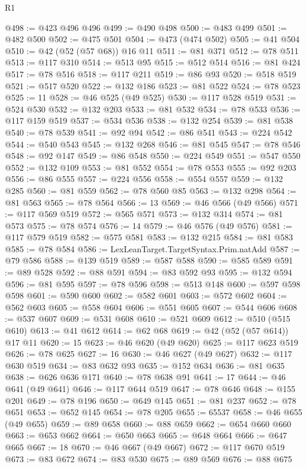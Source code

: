 \begin{lexlean}{R1}
\begin{coremodule}
@498 := @423 @496 @496
@499 := @490 @498
@500 := @483 @499
@501 := @482 @500
@502 := @475 @501
@504 := @473 (@474 @502)
@505 := @41 @504
@510 := @42 (@52 (@57 @68)) @16 @11
@511 := @81 @371
@512 := @78 @511
@513 := @117 @310
@514 := @513 @95
@515 := @512 @514
@516 := @81 @424
@517 := @78 @516
@518 := @117 @211
@519 := @86 @93
@520 := @518 @519
@521 := @517 @520
@522 := @132 @186
@523 := @81 @522
@524 := @78 @523
@525 := 11
@528 := @46 @525 (@49 @525)
@530 := @117 @528 @519
@531 := @524 @530
@532 := @132 @203
@533 := @81 @532
@534 := @78 @533
@536 := @117 @159 @519
@537 := @534 @536
@538 := @132 @254
@539 := @81 @538
@540 := @78 @539
@541 := @92 @94
@542 := @86 @541
@543 := @224 @542
@544 := @540 @543
@545 := @132 @268
@546 := @81 @545
@547 := @78 @546
@548 := @92 @147
@549 := @86 @548
@550 := @224 @549
@551 := @547 @550
@552 := @132 @109
@553 := @81 @552
@554 := @78 @553
@555 := @92 @203
@556 := @86 @555
@557 := @224 @556
@558 := @554 @557
@559 := @132 @285
@560 := @81 @559
@562 := @78 @560 @85
@563 := @132 @298
@564 := @81 @563
@565 := @78 @564
@566 := 13
@569 := @46 @566 (@49 @566)
@571 := @117 @569 @519
@572 := @565 @571
@573 := @132 @314
@574 := @81 @573
@575 := @78 @574
@576 := 14
@579 := @46 @576 (@49 @576)
@581 := @117 @579 @519
@582 := @575 @581
@583 := @132 @215
@584 := @81 @583
@585 := @78 @584
@586 := LexLeanTarget.TargetSyntax.Prim.natAdd
@587 := @79 @586
@588 := @139 @519
@589 := @587 @588
@590 := @585 @589
@591 := @89 @528
@592 := @88 @591
@594 := @83 @592 @93
@595 := @132 @594
@596 := @81 @595
@597 := @78 @596
@598 := @513 @148
@600 := @597 @598 @598
@601 := @590 @600
@602 := @582 @601
@603 := @572 @602
@604 := @562 @603
@605 := @558 @604
@606 := @551 @605
@607 := @544 @606
@608 := @537 @607
@609 := @531 @608
@610 := @521 @609
@612 := @510 (@515 @610)
@613 := @41 @612
@614 := @62 @68
@619 := @42 (@52 (@57 @614)) @17 @11
@620 := 15
@623 := @46 @620 (@49 @620)
@625 := @117 @623 @519
@626 := @78 @625
@627 := 16
@630 := @46 @627 (@49 @627)
@632 := @117 @630 @519
@634 := @83 @632 @93
@635 := @152 @634
@636 := @81 @635
@638 := @626 @636 @171
@640 := @78 @638 @91
@641 := 17
@644 := @46 @641 (@49 @641)
@646 := @117 @644 @519
@647 := @78 @646
@648 := @155 @201
@649 := @78 @196
@650 := @649 @145
@651 := @81 @237
@652 := @78 @651
@653 := @652 @145
@654 := @78 @205
@655 := 65537
@658 := @46 @655 (@49 @655)
@659 := @89 @658
@660 := @88 @659
@662 := @654 @660 @660
@663 := @653 @662
@664 := @650 @663
@665 := @648 @664
@666 := @647 @665
@667 := 18
@670 := @46 @667 (@49 @667)
@672 := @117 @670 @519
@673 := @83 @672
@674 := @83 @530
@675 := @89 @569
@676 := @88 @675

\end{coremodule}
\end{lexlean}
